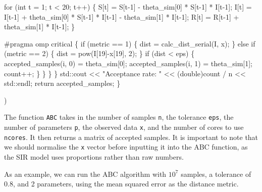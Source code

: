\documentclass[
]{article}
\newenvironment{Shaded}{\begin{snugshade}}{\end{snugshade}}
\newcommand{\CommentTok}[1]{\textcolor[rgb]{0.56,0.35,0.01}{\textit{#1}}}
\newcommand{\DecValTok}[1]{\textcolor[rgb]{0.00,0.00,0.81}{#1}}
\newcommand{\FloatTok}[1]{\textcolor[rgb]{0.00,0.00,0.81}{#1}}
\newcommand{\FunctionTok}[1]{\textcolor[rgb]{0.13,0.29,0.53}{\textbf{#1}}}
\newcommand{\NormalTok}[1]{#1}
\newcommand{\OtherTok}[1]{\textcolor[rgb]{0.56,0.35,0.01}{#1}}
\newcommand{\SpecialCharTok}[1]{\textcolor[rgb]{0.81,0.36,0.00}{\textbf{#1}}}
\newcommand{\StringTok}[1]{\textcolor[rgb]{0.31,0.60,0.02}{#1}}
\begin{document}
\begin{Shaded}
\begin{Highlighting}[]
\StringTok{      for (int t = 1; t \textless{} 20; t++) \{}
\StringTok{        S[t] = S[t{-}1] {-} theta\_sim[0] * S[t{-}1] * I[t{-}1];}
\StringTok{        I[t] = I[t{-}1] + theta\_sim[0] * S[t{-}1] * I[t{-}1] {-} theta\_sim[1] * I[t{-}1];}
\StringTok{        R[t] = R[t{-}1] + theta\_sim[1] * I[t{-}1];}
\StringTok{      \}}

\StringTok{      \#pragma omp critical}
\StringTok{      \{}
\StringTok{      if (metric == 1) \{}
\StringTok{        dist = calc\_dist\_serial(I, x);}
\StringTok{      \} else if (metric == 2) \{}
\StringTok{        dist = pow(I[19]{-}x[19], 2);}
\StringTok{      \}}
\StringTok{      if (dist \textless{} eps) \{}
\StringTok{        accepted\_samples(i, 0) = theta\_sim[0];}
\StringTok{        accepted\_samples(i, 1) = theta\_sim[1];}
\StringTok{        count++;}
\StringTok{      \}}
\StringTok{      \}}
\StringTok{    \}}
\StringTok{  \}}
\StringTok{  }
\StringTok{  std::cout \textless{}\textless{} "Acceptance rate: " \textless{}\textless{} (double)count / n \textless{}\textless{} std::endl;}
\StringTok{  return accepted\_samples;}
\StringTok{  }
\StringTok{\}}

\StringTok{\textquotesingle{}}\NormalTok{)}
\end{Highlighting}
\end{Shaded}

The function \texttt{ABC} takes in the number of samples \texttt{n}, the
tolerance \texttt{eps}, the number of parameters \texttt{p}, the
observed data \texttt{x}, and the number of cores to use
\texttt{ncores}. It then returns a matrix of accepted samples. It is
important to note that we should normalise the \texttt{x} vector before
inputting it into the ABC function, as the SIR model uses proportions
rather than raw numbers.

As an example, we can run the ABC algorithm with \(10^7\) samples, a
tolerance of 0.8, and 2 parameters, using the mean squared error as the
distance metric.

\begin{Shaded}
\end{Shaded}
\end{document}
